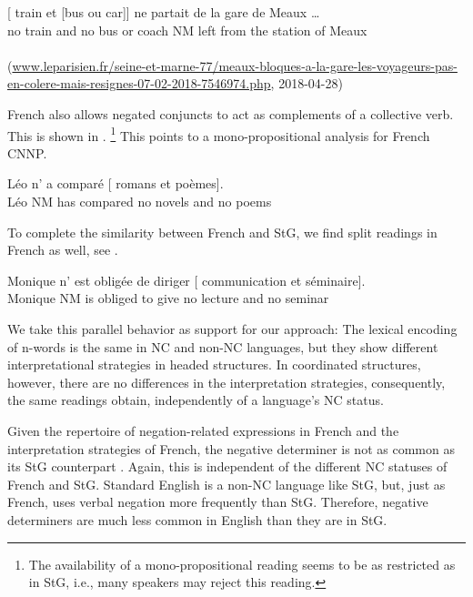 \documentclass[output=paper]{langsci/langscibook}
\begin{document}
\ea \label{Meaux}
\gll 
{}[ train et  [bus ou car]] ne partait de la gare de Meaux \ldots\\
no train and no bus or coach NM left from the station of Meaux\\
\glt {}\\
(\url{www.leparisien.fr/seine-et-marne-77/meaux-bloques-a-la-gare-les-voyageurs-pas-en-colere-mais-resignes-07-02-2018-7546974.php}, 2018-04-28)
\z 

French also allows negated conjuncts to act as 
complements of a collective verb.
This is shown in .%
\footnote{The availability of a mono-propositional reading seems to be as restricted as in StG, i.e., many speakers may reject this reading.}
This points to a mono-propositional analysis for French CNNP. 

\ea \label{roman-poeme}
\gll Léo n' a comparé [ romans et  poèmes].\\
Léo NM has compared \hphantom{[}no novels and no poems\\
\glt {}
\z 

To complete the similarity between French and StG, we find split readings in French as well, see .

\ea \label{fr-Monique}
\gll Monique n' est obligée de diriger [ communication et  séminaire].\\
Monique NM is obliged to give \hphantom{[}no lecture and no seminar\\
\glt {}
\z 



We take this parallel behavior as support for our approach: The lexical encoding of n-words is the same in NC and non-NC languages, but they show different interpretational strategies in headed structures. 
In coordinated structures, however, there are no differences in the interpretation strategies, consequently, the same readings obtain, independently of a language's NC status.

Given the repertoire of negation-related expressions in French and the interpretation strategies of French, the negative determiner  is not as common as its StG counterpart . 
Again, this is independent of the different NC statuses of French and StG. 
Standard English is a non-NC language like StG, but, just as French, uses verbal negation 
more frequently than StG. 
Therefore, negative determiners are much less common in English than they are in StG. 
\end{document}

